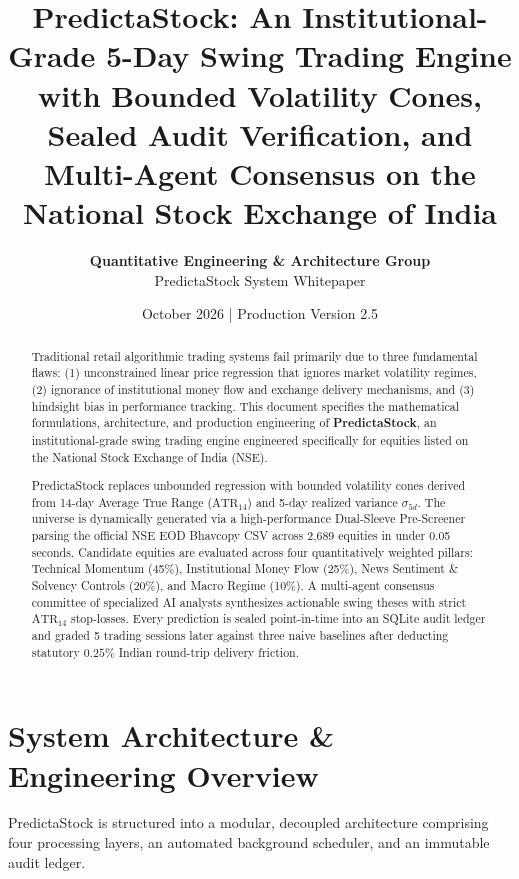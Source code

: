\documentclass[11pt,a4paper]{article}
\title{\textbf{PredictaStock: An Institutional-Grade 5-Day Swing Trading Engine with Bounded Volatility Cones, Sealed Audit Verification, and Multi-Agent Consensus on the National Stock Exchange of India}}
\author{\textbf{Quantitative Engineering \& Architecture Group} \\ PredictaStock System Whitepaper}
\date{October 2026 \quad | \quad Production Version 2.5}
\begin{document}
\maketitle

\begin{abstract}
Traditional retail algorithmic trading systems fail primarily due to three fundamental flaws: (1) unconstrained linear price regression that ignores market volatility regimes, (2) ignorance of institutional money flow and exchange delivery mechanisms, and (3) hindsight bias in performance tracking. This document specifies the mathematical formulations, architecture, and production engineering of \textbf{PredictaStock}, an institutional-grade swing trading engine engineered specifically for equities listed on the National Stock Exchange of India (NSE). 

PredictaStock replaces unbounded regression with bounded volatility cones derived from 14-day Average True Range ($\text{ATR}_{14}$) and 5-day realized variance $\sigma_{5d}$. The universe is dynamically generated via a high-performance Dual-Sleeve Pre-Screener parsing the official NSE EOD Bhavcopy CSV across 2,689 equities in under 0.05 seconds. Candidate equities are evaluated across four quantitatively weighted pillars: Technical Momentum (45\%), Institutional Money Flow (25\%), News Sentiment \& Solvency Controls (20\%), and Macro Regime (10\%). A multi-agent consensus committee of specialized AI analysts synthesizes actionable swing theses with strict $\text{ATR}_{14}$ stop-losses. Every prediction is sealed point-in-time into an SQLite audit ledger and graded 5 trading sessions later against three naive baselines after deducting statutory $0.25\%$ Indian round-trip delivery friction.
\end{abstract}

\tableofcontents
\newpage

\section{System Architecture \& Engineering Overview}

PredictaStock is structured into a modular, decoupled architecture comprising four processing layers, an automated background scheduler, and an immutable audit ledger.
\end{document}

